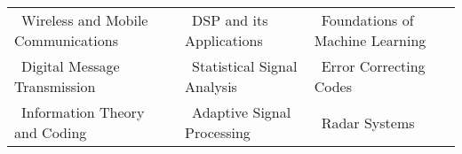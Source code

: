 \documentclass[10pt]{article}
\begin{document}
	\colorbox{bl}{}%
	\vspace{0.1cm} 

    \begin{comment}
    
	\begin{tabular}{ l l l }
		\textbullet\ Wireless and Mobile Communications &  \textbullet\ Digital Message Transmission & \textbullet\ Foundations of Machine Learning\\\vspace{0.05cm}
		\textbullet\ Digital Signal Processing $\&$ its Applications & \textbullet\ Statistical Signal Analysis & \textbullet\ Error Correcting Codes\\
		\textbullet\ Information Theory and Coding & \textbullet\ Adaptive Signal Processing   & \textbullet\ Radar Systems\\ 
	\end{tabular}
	
 	\end{comment}
 	
		\begin{tabular}{ l l l }
		\hspace{0.55cm}\textbullet\ Wireless and Mobile Communications &  \textbullet\ DSP and its Applications & \textbullet\ Foundations of Machine Learning\\
		\hspace{0.55cm}\textbullet\ Digital Message Transmission & \textbullet\ Statistical Signal Analysis & \textbullet\ Error Correcting Codes\\
		\hspace{0.55cm}\textbullet\ Information Theory and Coding & \textbullet\ Adaptive Signal Processing  & \textbullet\ Radar Systems\\
	\end{tabular}
	
	
	
	\vspace{0.1cm}
	

\colorbox{bl}{}
\end{document}
